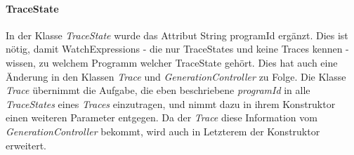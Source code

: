 \documentclass[parskip=full]{scrartcl}
\begin{document}
\paragraph{TraceState}
In der Klasse \textit{TraceState} wurde das Attribut String programId ergänzt. Dies ist nötig, damit WatchExpressions - die nur TraceStates und keine Traces kennen - wissen, zu welchem Programm welcher TraceState gehört. Dies hat auch eine Änderung in den Klassen \textit{Trace} und \textit{GenerationController} zu Folge. Die Klasse \textit{Trace} übernimmt die Aufgabe, die eben beschriebene \textit{programId} in alle \textit{TraceStates} eines \textit{Traces} einzutragen, und nimmt dazu in ihrem Konstruktor einen weiteren Parameter entgegen. Da der \textit{Trace} diese Information vom  \textit{GenerationController} bekommt, wird auch in Letzterem der Konstruktor erweitert.
 
\end{document}
